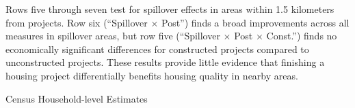 \documentclass[12pt]{article}
\begin{document}
Rows five through seven test for spillover effects in areas within 1.5 kilometers from projects.  Row six (``Spillover $\times$ Post'') finds a broad improvements across all measures in spillover areas, but row five (``Spillover $\times$ Post $\times$ Const.'') finds no economically significant differences for constructed projects compared to unconstructed projects.  These results provide little evidence that finishing a housing project differentially benefits housing quality in nearby areas.

  \clearpage%
\begin{landscape}
{\footnotesize
\begin{table}
\caption{Census Household-level Estimates}\label{table:censusestimates}
\centering
\resizebox{!}{.3\textwidth}{ 

}
\end{table}
}
\end{landscape}


% 


% 
\end{document}
